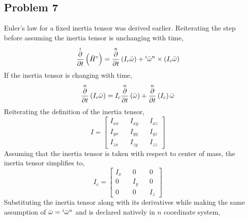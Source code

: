 \documentclass[class=report, 12pt, crop=false]{standalone}
\begin{document}
\begin{center}
\section{Problem 7}
\begin{comment}
\end{comment}
Euler's law for a fixed inertia tensor was derived earlier. Reiterating the step before assuming the inertia tensor is unchanging with time,
$$\overset{i}{\frac{\partial}{\partial t}}\left(\bar{H}^c\right) = \overset{n}{\frac{\partial}{\partial t}}\left(I_c \bar{\omega}\right) + {}^i\bar{\omega}^n\times (I_c \bar{\omega})$$
If the inertia tensor is changing with time,
$$\overset{n}{\frac{\partial}{\partial t}}\left(I_c \bar{\omega}\right) = I_c\overset{n}{\frac{\partial}{\partial t}}\left(\bar{\omega}\right) + \overset{n}{\frac{\partial}{\partial t}}\left(I_c \right)\bar{\omega}$$
Reiterating the definition of the inertia tensor,
$$I = \begin{bmatrix}
I_{xx} && I_{xy} && I_{xz} \\
I_{yx} && I_{yy} && I_{yz} \\
I_{zx} && I_{zy} && I_{zz}
\end{bmatrix}$$
Assuming that the inertia tensor is taken with respect to center of mass, the inertia tensor simplifies to,
$$I_c = \begin{bmatrix}
I_x && 0 && 0 \\
0 && I_y && 0 \\
0 && 0 && I_z
\end{bmatrix}$$
Substituting the inertia tensor along with its derivatives while making the same assumption of $\bar{\omega} = {}^i\bar{\omega}^n$ and is declared natively in $n$ coordinate system,


\end{center}
\end{document}
